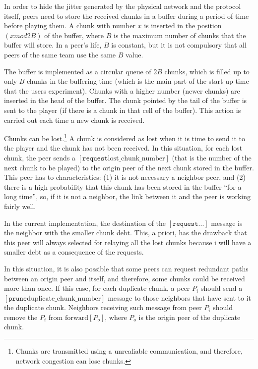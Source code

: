 
\label{sec:buffering_chunks}

In order to hide the jitter generated by the physical network and the
protocol itself, peers need to store the received chunks in a buffer
during a period of time before playing them. A chunk with number $x$
is inserted in the position $(x \mathit{mod} 2B)$ of the buffer, where
$B$ is the maximum number of chunks that the buffer will store. In a
peer's life, $B$ is constant, but it is not compulsory that all peers
of the same team use the same $B$ value.

The buffer is implemented as a circular queue of $2B$ chunks, which is
filled up to only $B$ chunks in the buffering time (which is the main
part of the start-up time that the users experiment). Chunks with a
higher number (newer chunks) are inserted in the head of the
buffer. The chunk pointed by the tail of the buffer is sent to the
player (if there is a chunk in that cell of the buffer). This action
is carried out each time a new chunk is received.

Chunks can be lost.\footnote{Chunks are transmitted using a
  unrealiable communication, and therefore, network congestion can
  lose chunks.} A chunk is considered as lost when it is time to send
it to the player and the chunk has not been received.  In this
situation, for each lost chunk, the peer sends a $[\mathtt{request}
  \text{lost\_chunk\_number}]$ (that is the number of the next chunk
to be played) to the origin peer of the next chunk stored in the
buffer. This peer has to characteristics: (1) it is not necessary a
neighbor peer, and (2) there is a high probability that this chunk has
been stored in the buffer ``for a long time'', so, if it is not a
neighbor, the link between it and the peer is working fairly well.

\begin{notex}
  In the current implementation, the destination of the
  $[\mathtt{request} ...]$ message is the neighbor with the smaller
  chunk debt. This, a priori, has the drawback that this peer will
  always selected for relaying all the lost chunks because i will have
  a smaller debt as a consequence of the requests.
\end{notex}
  
In this situation, it is also possible that some peers can request
redundant paths between an origin peer and itself, and therefore, some
chunks could be received more than once. If this case, for each
duplicate chunk, a peer $P_i$ should send a $[\mathtt{prune}
  \text{duplicate\_chunk\_number}]$ message to those neighbors that
have sent to it the duplicate chunk. Neighbors receiving such message
from peer $P_i$ should remove the $P_i$ from $\text{forward}[P_o]$,
where $P_o$ is the origin peer of the duplicate chunk.


